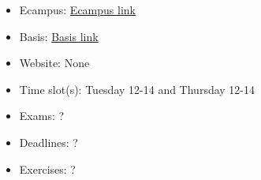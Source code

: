 \begin{tcolorbox}[enhanced,breakable,
	title=General Information,frame style={color=mycolor}]
    \begin{itemize}
        \item Ecampus: \href{https://ecampus.uni-bonn.de/goto_ecampus_crs_3440619.html}{Ecampus link}
        \item Basis: \href{https://basis.uni-bonn.de/qisserver/rds?state=verpublish&status=init&vmfile=no&publishid=247198&moduleCall=webInfo&publishConfFile=webInfo&publishSubDir=veranstaltung}{Basis link}
        \item Website: None
        \item Time slot(s): Tuesday 12-14 and Thursday 12-14
        \item Exams: ?
        \item Deadlines: ?
        \item Exercises: ?
    \end{itemize}
\end{tcolorbox}


    
